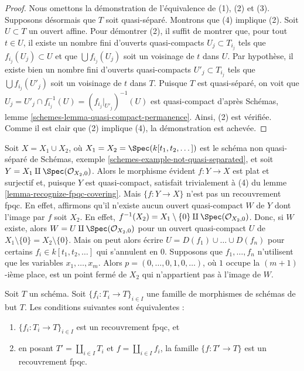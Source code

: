 \begin{proof}
Nous omettons la démonstration de l'équivalence de (1), (2) et (3).
Supposons désormais que $T$ soit quasi-séparé.
Montrons que (4) implique (2). Soit $U \subset T$ un ouvert affine.
Pour démontrer (2), il suffit de montrer que, pour tout $t \in U$, il existe
un nombre fini d'ouverts quasi-compacts $U_j \subset T_{i_j}$ tels que
$f_{i_j}(U_j) \subset U$ et que $\bigcup f_{i_j}(U_j)$
soit un voisinage de $t$ dans $U$. Par hypothèse, il existe bien
un nombre fini d'ouverts quasi-compacts $U'_j \subset T_{i_j}$ tels que
$\bigcup f_{i_j}(U'_j)$ soit un voisinage de $t$ dans $T$.
Puisque $T$ est quasi-séparé, on voit que
$U_j = U'_j \cap f_{i_j}^{-1}(U) = (f_{i_j}|_{U'_j})^{-1}(U)$
est quasi-compact d'après
Schémas, lemme \ref{schemes-lemma-quasi-compact-permanence}.
Ainsi, (2) est vérifiée. Comme il est clair que (2) implique
(4), la démonstration est achevée.
\end{proof}

\begin{example}
\label{example-not-fpqc}
Soit $X = X_1 \cup X_2$, où $X_1 = X_2 = \Spec(k[t_1,t_2,\dots])$
est le schéma non quasi-séparé de
Schémas, exemple \ref{schemes-example-not-quasi-separated}, et soit
$Y = X_1 \amalg \Spec(\mathcal{O}_{X_2, 0})$.
Alors le morphisme évident $f : Y \to X$
est plat et surjectif et, puisque $Y$ est quasi-compact,
satisfait trivialement à (4) du lemme \ref{lemma-recognize-fpqc-covering}.
Mais $\{f : Y \to X\}$ n'est pas un recouvrement fpqc. En effet, affirmons qu'il
n'existe aucun ouvert quasi-compact $W$ de $Y$ dont l'image par $f$ soit $X_2$.
En effet, $f^{-1}(X_2) = X_1 \setminus \{0\} \amalg \Spec(\mathcal{O}_{X_2, 0})$.
Donc, si $W$ existe, alors $W = U \amalg \Spec(\mathcal{O}_{X_2, 0})$
pour un ouvert quasi-compact $U$ de $X_1 \setminus \{0\} = X_2 \setminus \{0\}$.
Mais on peut alors écrire $U = D(f_1) \cup \ldots \cup D(f_n)$ pour
certains $f_i \in k[t_1, t_2, \ldots]$ qui s'annulent en $0$.
Supposons que $f_1, \ldots, f_n$ n'utilisent que les variables
$x_1, \ldots, x_m$. Alors $p = (0, \ldots, 0, 1, 0, \ldots)$, où $1$
occupe la $(m + 1)$-ième place, est un point fermé de $X_2$ qui n'appartient pas à l'image
de $W$.
\end{example}

\begin{lemma}
\label{lemma-disjoint-union-is-fpqc-covering}
Soit $T$ un schéma. Soit $\{f_i : T_i \to T\}_{i \in I}$ une famille de
morphismes de schémas de but $T$. Les conditions suivantes sont équivalentes :
\begin{enumerate}
\item $\{f_i : T_i \to T\}_{i \in I}$ est un recouvrement fpqc, et
\item en posant $T' = \coprod_{i \in I} T_i$ et $f = \coprod_{i \in I} f_i$,
la famille $\{f : T' \to T\}$ est un recouvrement fpqc.
\end{enumerate}
\end{lemma}


